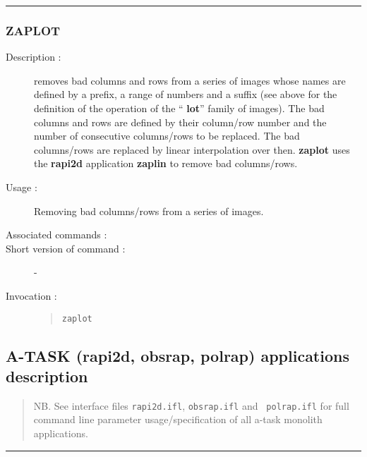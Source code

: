 \hrule 
\subsubsection*{\label{ZAPLOT}ZAPLOT}

\begin{description}

\item[Description :] removes bad columns and rows from a series of
images whose names are defined by a prefix, a range of numbers and a
suffix (see above for the definition of the operation of the ``{\bf
lot}'' family of images).  The bad columns and rows are defined by
their column/row number and the number of consecutive columns/rows to
be replaced.  The bad columns/rows are replaced by linear interpolation
over then.  {\bf zaplot} uses the {\bf rapi2d} application {\bf zaplin} 
to remove bad columns/rows.

\item[Usage :] Removing bad columns/rows from a series of images.
\item[Associated commands :] {\tt {}}
\item[Short version of command :] -
\item[Invocation :]

\begin{quote}{\tt  zaplot }\end{quote}

\end{description}


\newpage
\subsection{\label{ss:atask_descriptions}A-TASK (rapi2d, obsrap, polrap) applications description}

\begin{quote}
NB. See interface files {\tt rapi2d.ifl}, {\tt obsrap.ifl} and {\tt
polrap.ifl} for full command line parameter usage/specification of all
a-task monolith applications.
\end{quote}

\hrule 
